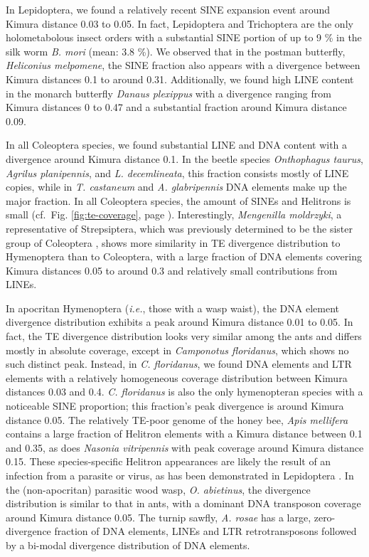 In Lepidoptera, we found a relatively recent SINE expansion event around
Kimura distance 0.03 to 0.05. In fact, Lepidoptera and Trichoptera are
the only holometabolous insect orders with a substantial SINE portion of
up to 9 \% in the silk worm \emph{B. mori} (mean: 3.8 \%). We observed
that in the postman butterfly, \emph{Heliconius melpomene}, the SINE
fraction also appears with a divergence between Kimura distances 0.1 to
around 0.31. Additionally, we found high LINE content in the monarch
butterfly \emph{Danaus plexippus} with a divergence ranging from Kimura
distances 0 to 0.47 and a substantial fraction around Kimura distance
0.09.

In all Coleoptera species, we found substantial LINE and DNA content
with a divergence around Kimura distance 0.1. In the beetle species
\emph{Onthophagus taurus}, \emph{Agrilus planipennis}, and \emph{L.
decemlineata}, this fraction consists mostly of LINE copies, while in
\emph{T. castaneum} and \emph{A. glabripennis} DNA elements make up the
major fraction. In all Coleoptera species, the amount of SINEs and
Helitrons is small (cf.~Fig. \ref{fig:te-coverage}, page
\pageref{fig:te-coverage}). Interestingly, \emph{Mengenilla moldrzyki},
a representative of Strepsiptera, which was previously determined to be
the sister group of Coleoptera \citep{Niehuis2012}, shows more
similarity in TE divergence distribution to Hymenoptera than to
Coleoptera, with a large fraction of DNA elements covering Kimura
distances 0.05 to around 0.3 and relatively small contributions from
LINEs.

In apocritan Hymenoptera (\emph{i.e.}, those with a wasp waist), the DNA
element divergence distribution exhibits a peak around Kimura distance
0.01 to 0.05. In fact, the TE divergence distribution looks very similar
among the ants and differs mostly in absolute coverage, except in
\emph{Camponotus floridanus}, which shows no such distinct peak.
Instead, in \emph{C. floridanus}, we found DNA elements and LTR elements
with a relatively homogeneous coverage distribution between Kimura
distances 0.03 and 0.4. \emph{C. floridanus} is also the only
hymenopteran species with a noticeable SINE proportion; this fraction's
peak divergence is around Kimura distance 0.05. The relatively TE-poor
genome of the honey bee, \emph{Apis mellifera} contains a large fraction
of Helitron elements with a Kimura distance between 0.1 and 0.35, as
does \emph{Nasonia vitripennis} with peak coverage around Kimura
distance 0.15. These species-specific Helitron appearances are likely
the result of an infection from a parasite or virus, as has been
demonstrated in Lepidoptera \citep{Coates2015}. In the (non-apocritan)
parasitic wood wasp, \emph{O. abietinus}, the divergence distribution is
similar to that in ants, with a dominant DNA transposon coverage around
Kimura distance 0.05. The turnip sawfly, \emph{A. rosae} has a large,
zero-divergence fraction of DNA elements, LINEs and LTR retrotransposons
followed by a bi-modal divergence distribution of DNA elements.

